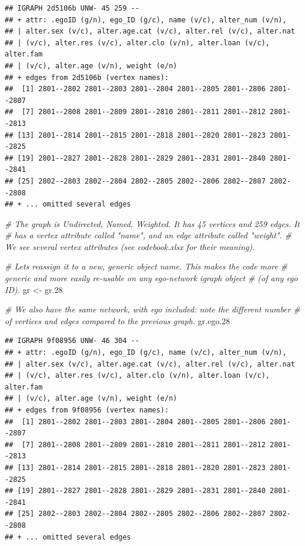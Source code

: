 \documentclass[
]{book}
\newenvironment{Shaded}{\begin{snugshade}}{\end{snugshade}}
\newcommand{\CommentTok}[1]{\textcolor[rgb]{0.56,0.35,0.01}{\textit{#1}}}
\newcommand{\FloatTok}[1]{\textcolor[rgb]{0.00,0.00,0.81}{#1}}
\newcommand{\NormalTok}[1]{#1}
\newcommand{\OtherTok}[1]{\textcolor[rgb]{0.56,0.35,0.01}{#1}}
\begin{document}
\begin{verbatim}
## IGRAPH 2d5106b UNW- 45 259 -- 
## + attr: .egoID (g/n), ego_ID (g/c), name (v/c), alter_num (v/n),
## | alter.sex (v/c), alter.age.cat (v/c), alter.rel (v/c), alter.nat
## | (v/c), alter.res (v/c), alter.clo (v/n), alter.loan (v/c), alter.fam
## | (v/c), alter.age (v/n), weight (e/n)
## + edges from 2d5106b (vertex names):
##  [1] 2801--2802 2801--2803 2801--2804 2801--2805 2801--2806 2801--2807
##  [7] 2801--2808 2801--2809 2801--2810 2801--2811 2801--2812 2801--2813
## [13] 2801--2814 2801--2815 2801--2818 2801--2820 2801--2823 2801--2825
## [19] 2801--2827 2801--2828 2801--2829 2801--2831 2801--2840 2801--2841
## [25] 2802--2803 2802--2804 2802--2805 2802--2806 2802--2807 2802--2808
## + ... omitted several edges
\end{verbatim}

\begin{Shaded}
\begin{Highlighting}[]
\CommentTok{\# The graph is Undirected, Named, Weighted. It has 45 vertices and 259 edges. It}
\CommentTok{\# has a vertex attribute called "name", and an edge attribute called "weight". }
\CommentTok{\# We see several vertex attributes (see codebook.xlsx for their meaning).}

\CommentTok{\# Let\textquotesingle{}s reassign it to a new, generic object name. This makes the code more }
\CommentTok{\# generic and more easily re{-}usable on any ego{-}network igraph object }
\CommentTok{\# (of any ego ID).}
\NormalTok{gr }\OtherTok{\textless{}{-}}\NormalTok{ gr}\FloatTok{.28}

\CommentTok{\# We also have the same network, with ego included: note the different number}
\CommentTok{\# of vertices and edges compared to the previous graph.}
\NormalTok{gr.ego}\FloatTok{.28}
\end{Highlighting}
\end{Shaded}

\begin{verbatim}
## IGRAPH 9f08956 UNW- 46 304 -- 
## + attr: .egoID (g/n), ego_ID (g/c), name (v/c), alter_num (v/n),
## | alter.sex (v/c), alter.age.cat (v/c), alter.rel (v/c), alter.nat
## | (v/c), alter.res (v/c), alter.clo (v/n), alter.loan (v/c), alter.fam
## | (v/c), alter.age (v/n), weight (e/n)
## + edges from 9f08956 (vertex names):
##  [1] 2801--2802 2801--2803 2801--2804 2801--2805 2801--2806 2801--2807
##  [7] 2801--2808 2801--2809 2801--2810 2801--2811 2801--2812 2801--2813
## [13] 2801--2814 2801--2815 2801--2818 2801--2820 2801--2823 2801--2825
## [19] 2801--2827 2801--2828 2801--2829 2801--2831 2801--2840 2801--2841
## [25] 2802--2803 2802--2804 2802--2805 2802--2806 2802--2807 2802--2808
## + ... omitted several edges
\end{verbatim}
\end{document}
